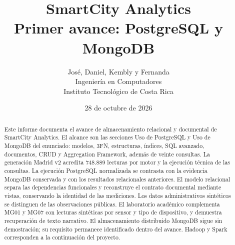 \documentclass[11pt,letterpaper]{article}
\title{SmartCity Analytics\\Primer avance: PostgreSQL y MongoDB}
\author{José, Daniel, Kembly y Fernanda\\
  Ingeniería en Computadores\\Instituto Tecnológico de Costa Rica}
\date{28 de octubre de 2026}
\begin{document}
\maketitle
\begin{abstract}
Este informe documenta el avance de almacenamiento relacional y documental de
SmartCity Analytics. El alcance son las secciones Uso de PostgreSQL y Uso de
MongoDB del enunciado: modelos, 3FN, estructuras, índices, SQL avanzado,
documentos, CRUD y Aggregation Framework, además de veinte consultas.
La generación Madrid v2 acredita 748.889 lecturas por motor y la ejecución
técnica de las consultas. La ejecución PostgreSQL normalizada se contrasta con
la evidencia MongoDB conservada y con los resultados relacionales anteriores.
El modelo relacional separa las dependencias funcionales y reconstruye el
contrato documental mediante vistas, conservando la identidad de las mediciones.
Los datos administrativos sintéticos se distinguen de las observaciones públicas.
El laboratorio académico complementa MG01 y MG07 con lecturas sintéticas por
sensor y tipo de dispositivo, y demuestra recuperación de texto narrativo.
El almacenamiento distribuido MongoDB sigue sin demostración; su requisito
permanece identificado dentro del avance. Hadoop y Spark corresponden a la
continuación del proyecto.
\end{abstract}
\newpage
\tableofcontents
\newpage






\end{document}
